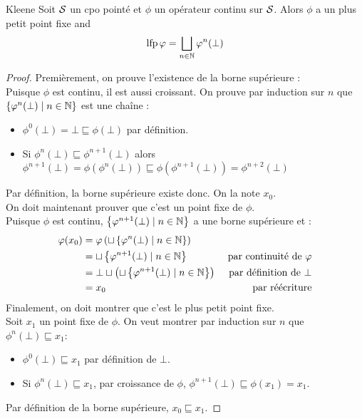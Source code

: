 \documentclass{cours}
\begin{document}
\begin{théorème}{Kleene}{}
Soit $\mathcal{S}$ un cpo pointé et $\phi$ un opérateur continu sur $\mathcal{S}$. Alors $\phi$ a un plus petit point fixe and
\[
	\operatorname{lfp} \varphi = \bigsqcup_{n \in \mathbb{N}} \varphi^{n}(\bot)
\]
\end{théorème}
\begin{proof}
	Premièrement, on prouve l'existence de la borne supérieure :\\
	Puisque $\phi$ est continu, il est aussi croissant. On prouve par induction sur $n$ que $\left\{\varphi^{n}(\bot) \mid n \in \mathbb{N}\right\}$ est une chaîne :
	\begin{itemize}
		\item $\phi^{0}(\bot) = \bot \sqsubseteq \phi(\bot)$ par définition.
		\item Si $\phi^{n}(\bot) \sqsubseteq \phi^{n + 1}(\bot)$ alors $\phi^{n + 1}(\bot) = \phi\left(\phi^{n}(\bot)\right)\sqsubseteq\phi\left(\phi^{n + 1}(\bot)\right) = \phi^{n + 2}(\bot)$
	\end{itemize}
	Par définition, la borne supérieure existe donc. On la note $x_{0}$.\\

	On doit maintenant prouver que c'est un point fixe de $\phi$.\\
	Puisque $\phi$ est continu, $\left\{\varphi^{n + 1}(\bot) \mid n \in \mathbb{N}\right\}$ a une borne supérieure et :
	\[
		\begin{aligned}
			\varphi(x_{0}) & = \varphi\left(\sqcup\left\{\varphi^{n}(\bot) \mid n \in \mathbb{N}\right\}\right)          &                                 \\
			            & = \sqcup\left\{\varphi^{n + 1}(\bot)\mid n\in \mathbb{N}\right\}                         & \text{ par continuité de } \varphi \\
			            & =\bot \sqcup \left(\sqcup\left\{\varphi^{n + 1}(\bot)\mid n\in \mathbb{N}\right\}\right) & \text{ par définition de } \bot \\
			            & =x_{0}                                                                        & \text{ par réécriture}
		\end{aligned}
	\]
	Finalement, on doit montrer que c'est le plus petit point fixe.\\
	Soit $x_{1}$ un point fixe de $\phi$. On veut montrer par induction sur $n$ que $\phi^{n}(\bot) \sqsubseteq x_{1}$:
	\begin{itemize}
		\item $\phi^{0}(\bot) \sqsubseteq x_{1}$ par définition de $\bot$.
		\item Si $\phi^{n}(\bot) \sqsubseteq x_{1}$, par croissance de $\phi$, $\phi^{n + 1}(\bot) \sqsubseteq \phi(x_{1}) = x_{1}$.
	\end{itemize}
	Par définition de la borne supérieure, $x_{0} \sqsubseteq x_{1}$.
\end{proof}
\end{document}
